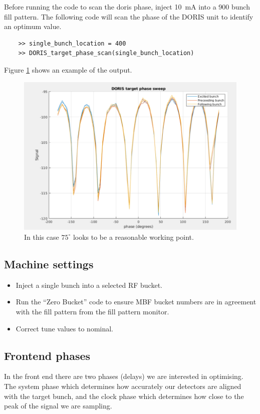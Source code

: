\documentclass{report}
\begin{document}
Before running the code to scan the doris phase, inject 10~mA into a 900 bunch fill pattern.
The following code will scan the phase of the DORIS unit to identify an optimum value. 
\begin{verbatim}
    >> single_bunch_location = 400
    >> DORIS_target_phase_scan(single_bunch_location) 
\end{verbatim}
Figure \ref{fig:DORIS_phase_scan} shows an example of the output.
\begin{figure}[ht]
    \centering
    \includegraphics[width=0.8\linewidth]{DORIS_scan.png}
    \caption{In this case $75^\circ$ looks to be a reasonable working point.}
    \label{fig:DORIS_phase_scan}
\end{figure}

\clearpage
\subsection{Machine settings}
\begin{itemize}
    \item {Inject a single bunch into a selected RF bucket.}
    \item{Run the “Zero Bucket” code to ensure MBF bucket numbers are in agreement with the fill pattern from the fill pattern monitor. }
    \item{Correct tune values to nominal.}
\end{itemize}

\subsection{Frontend phases} 
In the front end there are two phases (delays) we are interested in optimising. The system phase which determines how accurately our detectors are aligned with the target bunch, and the clock phase which determines how close to the peak of the signal we are sampling. 
\end{document}
